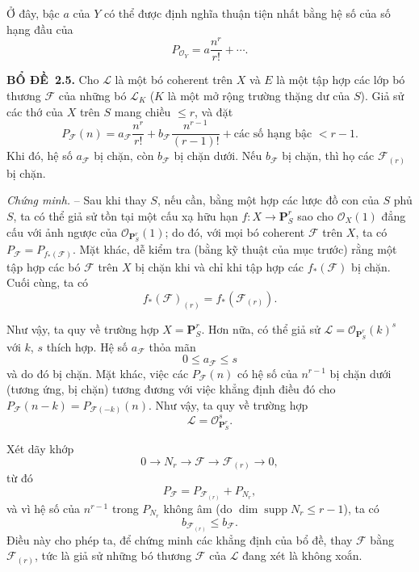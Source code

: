 \documentclass[11pt,twoside,openany]{book}
\numberwithin{equation}{section}
\newcommand{\src}[1]{%
  \phantomsection\hypertarget{src:\fgasourceid:#1}{}%
  \marginpar{\raggedleft\footnotesize\sffamily #1}%
}
\newcommand{\fgasourceid}{unset}
\newcommand{\result}[2]{\par\medskip\noindent\textbf{#1\if\relax\detokenize{#2}\relax\else\ #2\fi.}\quad}
\begin{document}
Ở đây, bậc $a$ của $Y$ có thể được định nghĩa thuận tiện nhất bằng hệ số của
số hạng đầu của
\[
P_{\mathcal O_Y}=a\frac{n^r}{r!}+\cdots.
\]

\result{BỔ ĐỀ}{2.5} Cho $\mathcal L$ là một bó coherent trên $X$ và $E$ là
một tập hợp các lớp bó thương $\mathcal F$ của những bó $\mathcal L_K$ ($K$
là một mở rộng trường thặng dư của $S$). Giả sử các thớ của $X$ trên $S$ mang
chiều $\leq r$, và đặt
\[
P_{\mathcal F}(n)=a_{\mathcal F}\frac{n^r}{r!}
+b_{\mathcal F}\frac{n^{r-1}}{(r-1)!}
+\text{các số hạng bậc $<r-1$}.
\]
Khi đó, hệ số $a_{\mathcal F}$ bị chặn, còn $b_{\mathcal F}$ bị chặn dưới.
Nếu $b_{\mathcal F}$ bị chặn, thì họ các $\mathcal F_{(r)}$ bị chặn.

\emph{Chứng minh.} -- Sau khi thay $S$, nếu cần, bằng một hợp các lược đồ con
của $S$ phủ $S$, ta có thể giả sử tồn tại một cấu xạ hữu hạn
$f:X\longrightarrow\mathbf P^r_S$ sao cho $\mathcal O_X(1)$ đẳng cấu với ảnh
ngược của $\mathcal O_{\mathbf P^r_S}(1)$; do đó, với mọi bó coherent
$\mathcal F$ trên $X$, ta có
$P_{\mathcal F}=P_{f_*(\mathcal F)}$. Mặt khác, dễ kiểm tra (bằng kỹ thuật của
mục trước) rằng một tập hợp các bó $\mathcal F$ trên $X$ bị chặn khi và chỉ khi
tập hợp các $f_*(\mathcal F)$ bị chặn. Cuối cùng, ta có
\[
f_*(\mathcal F)_{(r)}=f_*(\mathcal F_{(r)}).
\]
\src{256}
Như vậy, ta quy về trường hợp $X=\mathbf P^r_S$. Hơn nữa, có thể giả sử
$\mathcal L=\mathcal O_{\mathbf P^r_S}(k)^s$ với $k$, $s$ thích hợp. Hệ số
$a_{\mathcal F}$ thỏa mãn
\[
0\leq a_{\mathcal F}\leq s
\]
và do đó bị chặn. Mặt khác, việc các $P_{\mathcal F}(n)$ có hệ số của
$n^{r-1}$ bị chặn dưới (tương ứng, bị chặn) tương đương với việc khẳng định
điều đó cho
$P_{\mathcal F}(n-k)=P_{\mathcal F(-k)}(n)$. Như vậy, ta quy về trường hợp
\[
\mathcal L=\mathcal O_{\mathbf P^r_S}^{s}.
\]

Xét dãy khớp
\[
0\longrightarrow N_r\longrightarrow\mathcal F
\longrightarrow\mathcal F_{(r)}\longrightarrow0,
\]
từ đó
\[
P_{\mathcal F}=P_{\mathcal F_{(r)}}+P_{N_r},
\]
và vì hệ số của $n^{r-1}$ trong $P_{N_r}$ không âm (do
$\dim\operatorname{supp}N_r\leq r-1$), ta có
\[
b_{\mathcal F_{(r)}}\leq b_{\mathcal F}.
\]
Điều này cho phép ta, để chứng minh các khẳng định của bổ đề, thay
$\mathcal F$ bằng $\mathcal F_{(r)}$, tức là giả sử những bó thương
$\mathcal F$ của $\mathcal L$ đang xét là không xoắn.
\end{document}

